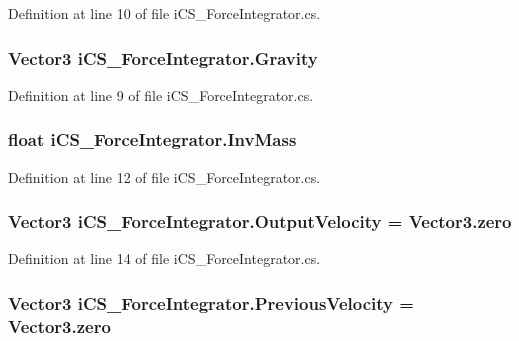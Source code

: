 Definition at line 10 of file i\+C\+S\+\_\+\+Force\+Integrator.\+cs.

\hypertarget{classi_c_s___force_integrator_a084a06cb73f3201769617838fbe001e0}{
\subsubsection[{Gravity}]{\setlength{\rightskip}{0pt plus 5cm}Vector3 i\+C\+S\+\_\+\+Force\+Integrator.\+Gravity}}\label{classi_c_s___force_integrator_a084a06cb73f3201769617838fbe001e0}


Definition at line 9 of file i\+C\+S\+\_\+\+Force\+Integrator.\+cs.

\hypertarget{classi_c_s___force_integrator_a8edc33516493f349b7e1054d38a5fa1d}{
\subsubsection[{Inv\+Mass}]{\setlength{\rightskip}{0pt plus 5cm}float i\+C\+S\+\_\+\+Force\+Integrator.\+Inv\+Mass}}\label{classi_c_s___force_integrator_a8edc33516493f349b7e1054d38a5fa1d}


Definition at line 12 of file i\+C\+S\+\_\+\+Force\+Integrator.\+cs.

\hypertarget{classi_c_s___force_integrator_a2b16289c2a513d99cf5dbc035d71e39d}{
\subsubsection[{Output\+Velocity}]{\setlength{\rightskip}{0pt plus 5cm}Vector3 i\+C\+S\+\_\+\+Force\+Integrator.\+Output\+Velocity = Vector3.\+zero}}\label{classi_c_s___force_integrator_a2b16289c2a513d99cf5dbc035d71e39d}


Definition at line 14 of file i\+C\+S\+\_\+\+Force\+Integrator.\+cs.

\hypertarget{classi_c_s___force_integrator_a0b4b7119426703f30822dd445767adfc}{
\subsubsection[{Previous\+Velocity}]{\setlength{\rightskip}{0pt plus 5cm}Vector3 i\+C\+S\+\_\+\+Force\+Integrator.\+Previous\+Velocity = Vector3.\+zero}}\label{classi_c_s___force_integrator_a0b4b7119426703f30822dd445767adfc}


